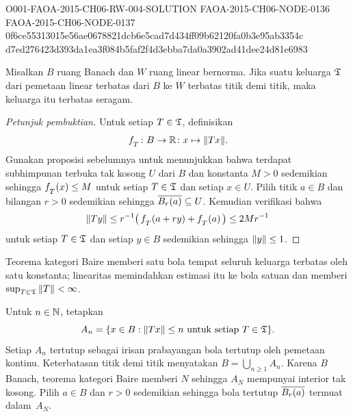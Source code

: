 \begin{o001readerwork}
  {O001-FAOA-2015-CH06-RW-004-SOLUTION}
  {FAOA-2015-CH06-NODE-0136}
  {FAOA-2015-CH06-NODE-0137}
  {0f6ce55313015e56ae0678821dcb6e5cad7d434ff09b62120fa0b3e95ab3354c}
  {d7ed276423d393da1ea3f084b5faf2f4d3ebba7da0a3902ad41dee24d81e6983}
\begin{o001result}
\begin{thm}\label{thm_PUB} Misalkan $B$ ruang Banach dan $W$ ruang linear bernorma.
Jika suatu keluarga $\mathfrak{T}$ dari pemetaan linear terbatas dari $B$ ke $W$ terbatas titik demi
titik, maka keluarga itu terbatas seragam.
\end{thm}
\end{o001result}
\begin{o001sourcehint}
\begin{proof}[\emph{Petunjuk pembuktian}] Untuk setiap $T \in \mathfrak{T}$, definisikan
  \[ f_{{}_{\scriptstyle{T}}}\colon B \rightarrow \mathbb{R}\colon x \mapsto \lVert Tx\rVert. \]
Gunakan proposisi sebelumnya untuk menunjukkan bahwa terdapat subhimpunan terbuka tak kosong $U$ dari $B$
dan konstanta $M > 0$ sedemikian sehingga $f_{{}_{\scriptstyle{T}}}(x) \le M$ untuk setiap $T \in \mathfrak{T}$ dan setiap
$x \in U$. Pilih titik $a \in B$ dan bilangan $r > 0$ sedemikian sehingga $\overline{B_r(a)} \subseteq
U$. Kemudian verifikasi bahwa
  \[ \lVert Ty\rVert \le r^{-1}\bigl(\, f_{{}_{\scriptstyle{T}}}(a + ry) + f_{{}_{\scriptstyle{T}}}(a)\,\bigr) \le 2Mr^{-1} \]
untuk setiap $T \in \mathfrak{T}$ dan setiap $y \in B$ sedemikian sehingga $\lVert y\rVert \le 1$. \ns
\end{proof}
\end{o001sourcehint}
\begin{o001answer}
Teorema kategori Baire memberi satu bola tempat seluruh keluarga terbatas oleh
satu konstanta; linearitas memindahkan estimasi itu ke bola satuan dan memberi
$\sup_{T\in\mathfrak{T}}\|T\|<\infty$.
\end{o001answer}
\begin{o001proof}
Untuk $n\in\mathbb{N}$, tetapkan
\[
 A_n=\{x\in B:\|Tx\|\leq n\text{ untuk setiap }T\in\mathfrak{T}\}.
\]
Setiap $A_n$ tertutup sebagai irisan prabayangan bola tertutup oleh pemetaan
kontinu. Keterbatasan titik demi titik menyatakan
$B=\bigcup_{n\geq1}A_n$. Karena $B$ Banach, teorema kategori Baire memberi
$N$ sehingga $A_N$ mempunyai interior tak kosong. Pilih $a\in B$ dan $r>0$
sedemikian sehingga bola tertutup $\overline{B_r(a)}$ termuat dalam~$A_N$.


\end{o001proof}
\end{o001readerwork}
